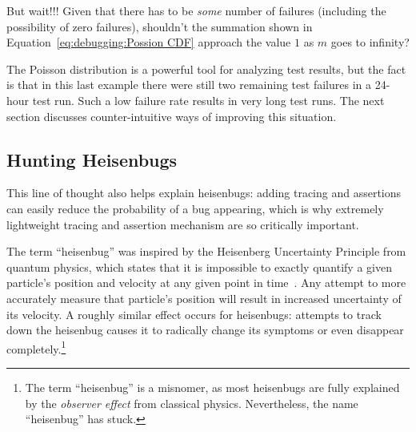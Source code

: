 \QuickQuiz{}
	But wait!!!
	Given that there has to be \emph{some} number of failures
	(including the possibility of zero failures),
	shouldn't the summation shown in
	Equation~\ref{eq:debugging:Possion CDF}
	approach the value $1$ as $m$ goes to infinity?
 \QuickQuizEnd

The Poisson distribution is a powerful tool for analyzing test results,
but the fact is that in this last example there were still two remaining
test failures in a 24-hour test run.
Such a low failure rate results in very long test runs.
The next section discusses counter-intuitive ways of improving this situation.

\subsection{Hunting Heisenbugs}
\label{sec:debugging:Hunting Heisenbugs}

This line of thought also helps explain heisenbugs:
adding tracing and assertions can easily reduce the probability
of a bug appearing, which
is why extremely lightweight tracing and assertion mechanism are
so critically important.

The term ``heisenbug'' was inspired by the Heisenberg Uncertainty
Principle from quantum physics, which states that it is impossible to
exactly quantify a given particle's position and velocity at any given
point in time~\cite{WeinerHeisenberg1927Uncertain}.
Any attempt to more accurately measure that particle's position will
result in increased uncertainty of its velocity.
A roughly similar effect occurs for heisenbugs: attempts to track down
the heisenbug causes it to radically change its symptoms or even disappear
completely.\footnote{
	The term ``heisenbug'' is a misnomer, as most heisenbugs are
	fully explained by the \emph{observer effect} from classical
	physics.
	Nevertheless, the name ``heisenbug'' has stuck.}

